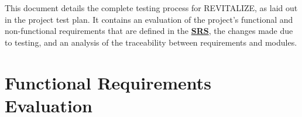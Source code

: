 \documentclass[12pt, titlepage]{article}
\begin{document}
\listoftables %

\listoffigures %

\newpage


This document details the complete testing process for REVITALIZE, as laid out in the project test plan. It contains an evaluation of the project’s functional and non-functional requirements that are defined in the \hyperlink{https://github.com/BillNguyen1999/REVITALIZE/blob/main/docs/SRS/SRS.pdf}{\textbf{SRS}}, the changes made due to testing, and an analysis of the traceability between requirements and modules.

\section{Functional Requirements Evaluation}
\end{document}
